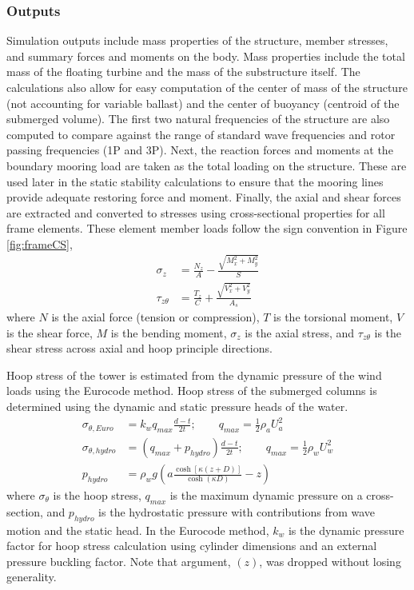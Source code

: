 \subsubsection{Outputs}
Simulation outputs include mass properties of the structure, member
stresses, and summary forces and moments on the body.  Mass properties
include the total mass of the floating turbine and the mass of the
substructure itself.  The calculations also allow for easy computation
of the center of mass of the structure (not accounting for variable
ballast) and the center of buoyancy (centroid of the submerged volume).
The first two natural frequencies of the structure are also computed to
compare against the range of standard wave frequencies and rotor passing
frequencies (1P and 3P).  Next, the reaction forces and moments at the
boundary mooring load are taken as the total loading on the structure.
These are used later in the static stability calculations to ensure that
the mooring lines provide adequate restoring force and moment.  Finally,
the axial and shear forces are extracted and converted to stresses using
cross-sectional properties for all frame elements.  These element member
loads follow the sign convention in Figure \ref{fig:frameCS},
\begin{align*}
  \sigma_z &= \frac{N_z}{A} - \frac{\sqrt{M_x^2 + M_y^2}}{S}\\
  \tau_{z\theta} &= \frac{T_z}{C} + \frac{\sqrt{V_x^2 + V_y^2}}{A_s}
\end{align*}
where $N$ is the axial force (tension or compression), $T$ is the
torsional moment, $V$ is the shear force, $M$ is the bending moment,
$\sigma_z$ is the axial stress, and $\tau_{z\theta}$ is the shear
stress across axial and hoop principle directions.

Hoop
stress of the tower is estimated from the dynamic pressure of the
wind loads using the Eurocode method.  Hoop stress of the submerged
columns is determined using the dynamic and static pressure heads of the
water.
\begin{align*}
  \sigma_{\theta,Euro} &= k_w q_{max} \frac{d-t}{2t};\qquad q_{max} =
                         \frac{1}{2}\rho_a U_a^2\\
  \sigma_{\theta,hydro} &= \left(q_{max}+p_{hydro}\right) \frac{d-t}{2t};\qquad q_{max} =
                          \frac{1}{2}\rho_w U_w^2\\
  p_{hydro} &= \rho_w g \left( a\frac{\cosh\left[\kappa\left(z + D \right)\right]}{\cosh\left(\kappa D\right)} - z\right)
\end{align*}
where $\sigma_{\theta}$ is the hoop stress, $q_{max}$ is the maximum
dynamic pressure on a cross-section, and $p_{hydro}$ is the hydrostatic
pressure with contributions from wave motion and the static head.  In
the Eurocode method, $k_w$ is the dynamic pressure factor for hoop
stress calculation using cylinder dimensions and an external pressure
buckling factor.  Note that argument, $(z)$, was dropped without losing
generality.



